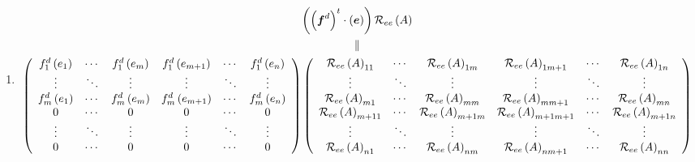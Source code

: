 \documentclass[aps,preprint]{revtex4}%
\begin{document}
\begin{enumerate}
\begin{enumerate}
\begin{enumerate}
\item
\begin{gather}
\left(  \left(  \boldsymbol{f}^{d}\right)  ^{t}\cdot\left(  \boldsymbol{e}%
\right)  \right)  \mathcal{R}_{ee}\left(  A\right) \\
\parallel\\
\left(
\begin{array}
[c]{cccccc}%
f_{1}^{d}\left(  e_{1}\right)  & \cdots & f_{1}^{d}\left(  e_{m}\right)  &
f_{1}^{d}\left(  e_{m+1}\right)  & \cdots & f_{1}^{d}\left(  e_{n}\right) \\
\vdots & \ddots & \vdots & \vdots & \ddots & \vdots\\
f_{m}^{d}\left(  e_{1}\right)  & \cdots & f_{m}^{d}\left(  e_{m}\right)  &
f_{m}^{d}\left(  e_{m+1}\right)  & \cdots & f_{m}^{d}\left(  e_{n}\right) \\
0 & \cdots & 0 & 0 & \cdots & 0\\
\vdots & \ddots & \vdots & \vdots & \ddots & \vdots\\
0 & \cdots & 0 & 0 & \cdots & 0
\end{array}
\right)  \left(
\begin{array}
[c]{cccccc}%
\mathcal{R}_{ee}\left(  A\right)  _{11} & \cdots & \mathcal{R}_{ee}\left(
A\right)  _{1m} & \mathcal{R}_{ee}\left(  A\right)  _{1m+1} & \cdots &
\mathcal{R}_{ee}\left(  A\right)  _{1n}\\
\vdots & \ddots & \vdots & \vdots & \ddots & \vdots\\
\mathcal{R}_{ee}\left(  A\right)  _{m1} & \cdots & \mathcal{R}_{ee}\left(
A\right)  _{mm} & \mathcal{R}_{ee}\left(  A\right)  _{mm+1} & \cdots &
\mathcal{R}_{ee}\left(  A\right)  _{mn}\\
\mathcal{R}_{ee}\left(  A\right)  _{m+11} & \cdots & \mathcal{R}_{ee}\left(
A\right)  _{m+1m} & \mathcal{R}_{ee}\left(  A\right)  _{m+1m+1} & \cdots &
\mathcal{R}_{ee}\left(  A\right)  _{m+1n}\\
\vdots & \ddots & \vdots & \vdots & \ddots & \vdots\\
\mathcal{R}_{ee}\left(  A\right)  _{n1} & \cdots & \mathcal{R}_{ee}\left(
A\right)  _{nm} & \mathcal{R}_{ee}\left(  A\right)  _{nm+1} & \cdots &
\mathcal{R}_{ee}\left(  A\right)  _{nn}%
\end{array}
\right)
\end{gather}



\end{enumerate}
\end{enumerate}
\end{enumerate}
\end{document}
